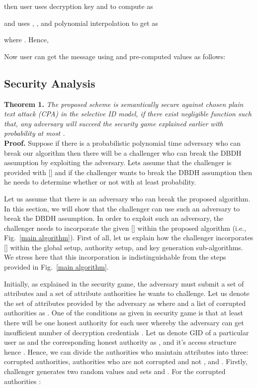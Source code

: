 \documentclass[10pt,journal]{IEEEtran}
\begin{document}
then user uses decryption key  and  to compute  as

and uses , ,  and polynomial interpolation to get  as


where . Hence,

Now user can get the message  using  and pre-computed values  as follows:







\subsection{Security Analysis}

\noindent \textbf{Theorem 1.} \emph{The proposed scheme is  semantically secure against chosen plain text attack (CPA) in the selective ID model, if there exist negligible function  such that,  any adversary will succeed the security game explained earlier with probability at most .}\\

\noindent \textbf{Proof.} Suppose if there is a probabilistic polynomial time adversary who can break our algorithm then  there will be a challenger who  can break the DBDH assumption by exploiting the adversary. Lets assume that the challenger is provided with  [] and if  the challenger wants to break the DBDH assumption then he needs to determine whether   or not with at least  probability.

Let us assume that there is an adversary who can break the proposed algorithm. In this section, we will show that the challenger can use such an adversary to break the DBDH assumption. In order to exploit such an adversary, the challenger needs to incorporate the given [] within the proposed algorithm (i.e., Fig.~\ref{main algorithm}). First of all, let us explain how the challenger incorporates [] within the global setup, authority setup, and key generation sub-algorithms. We stress here that this incorporation is indistinguishable from the steps provided in Fig.~\ref{main algorithm}.

Initially, as explained in the security game, the adversary must submit a set of attributes and a set of attribute authorities he wants to challenge. Let us denote the set of attributes provided by the adversary as  where  and a list of corrupted authorities as . One of the conditions as given in security game is that at least there will be one honest authority for each user whereby the adversary can get insufficient number of decryption credentials \cite{maabe}. Let us denote GID of a particular user as  and the corresponding honest authority as , and it's access structure  hence . Hence, we can divide the authorities who maintain attributes  into three: corrupted authorities, authorities who are not corrupted and not , and .
Firstly, challenger generates two random values  and sets  and . For the corrupted authorities :
\end{document}
